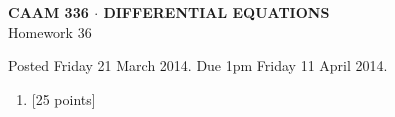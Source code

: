 \documentclass[10pt]{article}
\begin{document}
\vspace*{-5em}
\begin{center}
\large \textsf{\textbf{CAAM 336 $\cdot$ DIFFERENTIAL EQUATIONS}\\[0.5em]
Homework 36 }
\end{center}

Posted Friday 21 March 2014.  Due 1pm Friday 11 April 2014.

\begin{enumerate}\addtocounter{enumi}{35}
\item {[25 points]}  
\end{enumerate}
\end{document}
